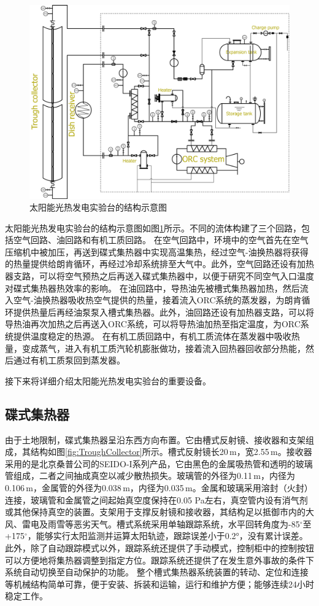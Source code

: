 \begin{figure}[!ht]
\centering
\includegraphics[width=1.0\textwidth]{fig/platform.jpg}
\caption{太阳能光热发电实验台的结构示意图}\label{fig:platform}
\end{figure}
太阳能光热发电实验台的结构示意图如图\ref{fig:platform}所示。不同的流体构建了三个回路，包括空气回路、油回路和有机工质回路。
在空气回路中，环境中的空气首先在空气压缩机中被加压，再送到碟式集热器中实现高温集热，经过空气-油换热器将获得的热量提供给朗肯循环，再经过冷却系统排至大气中。此外，空气回路还设有加热器支路，可以将空气预热之后再送入碟式集热器中，以便于研究不同空气入口温度对碟式集热器热效率的影响。
在油回路中，导热油先被槽式集热器加热，然后流入空气-油换热器吸收热空气提供的热量，接着流入ORC系统的蒸发器，为朗肯循环提供热量后再经油泵泵入槽式集热器。此外，油回路还设有加热器支路，可以将导热油再次加热之后再送入ORC系统，可以将导热油加热至指定温度，为ORC系统提供温度稳定的热源。
在有机工质回路中，有机工质流体在蒸发器中吸收热量，变成蒸气，进入有机工质汽轮机膨胀做功，接着流入回热器回收部分热能，然后通过有机工质泵回到蒸发器。

接下来将详细介绍太阳能光热发电实验台的重要设备。

\subsection{碟式集热器}
由于土地限制，碟式集热器呈沿东西方向布置。它由槽式反射镜、接收器和支架组成，其结构如图\ref{fig:TroughCollector}所示。槽式反射镜长20$\,\mathrm{m}$，宽2.55$\,\mathrm{m}$。接收器采用的是北京桑普公司的SEIDO-I系列产品，它由黑色的金属吸热管和透明的玻璃管组成，二者之间抽成真空以减少散热损失。玻璃管的外径为0.11$\,\mathrm{m}$，内径为0.106$\,\mathrm{m}$，金属管的外径为0.038$\,\mathrm{m}$，内径为0.035$\,\mathrm{m}$。金属和玻璃采用溶封（火封）连接，玻璃管和金属管之间起始真空度保持在0.05 Pa左右，真空管内设有消气剂或其他保持真空的装置。支架用于支撑反射镜和接收器，其结构足以抵御市内的大风、雷电及雨雪等恶劣天气。槽式系统采用单轴跟踪系统，水平回转角度为-85$^\circ$至+175$^\circ$，能够实行太阳监测并运算太阳轨迹，跟踪误差小于0.2°，没有累计误差。此外，除了自动跟踪模式以外，跟踪系统还提供了手动模式，控制柜中的控制按钮可以方便地将集热器调整到指定方位。跟踪系统还提供了在发生意外事故的条件下系统自动切换至自动保护的功能。
整个槽式集热器系统装置的转动、定位和连接等机械结构简单可靠，便于安装、拆装和运输，运行和维护方便；能够连续24小时稳定工作。

